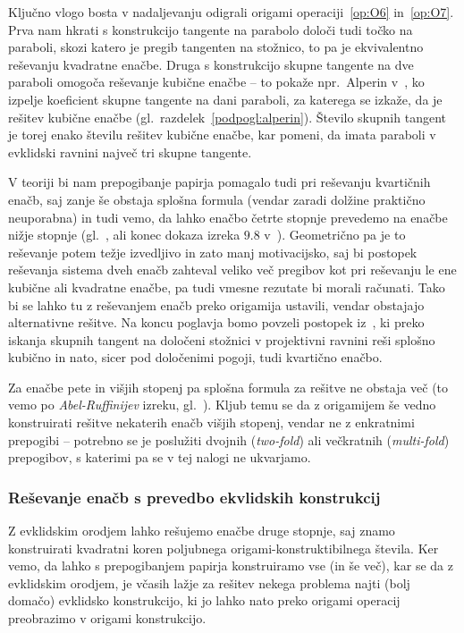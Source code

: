 Ključno vlogo bosta v nadaljevanju odigrali origami operaciji~\ref{op:O6} in~\ref{op:O7}. Prva nam hkrati s konstrukcijo tangente na parabolo določi tudi točko na paraboli, skozi katero je pregib tangenten na stožnico, to pa je ekvivalentno reševanju kvadratne enačbe. Druga s konstrukcijo skupne tangente na dve paraboli omogoča reševanje kubične enačbe -- to pokaže npr.\ Alperin v~\cite[str.\ 129]{alperin2000}, ko izpelje koeficient skupne tangente na dani paraboli, za katerega se izkaže, da je rešitev kubične enačbe (gl.\ razdelek~\ref{podpogl:alperin}). Število skupnih tangent je torej enako številu rešitev kubične enačbe, kar pomeni, da imata paraboli v evklidski ravnini največ tri skupne tangente.

V teoriji bi nam prepogibanje papirja pomagalo tudi pri reševanju kvartičnih enačb, saj zanje še obstaja splošna formula (vendar zaradi dolžine praktično neuporabna) in tudi vemo, da lahko enačbo četrte stopnje prevedemo na enačbe nižje stopnje (gl.\ \cite{quartics2012}, \cite{wikiquartic} ali konec dokaza izreka $9.8$ v~\cite[str.\ 134]{geometricconstructions}). Geometrično pa je to reševanje potem težje izvedljivo in zato manj motivacijsko, saj bi postopek reševanja sistema dveh enačb zahteval veliko več pregibov kot pri reševanju le ene kubične ali kvadratne enačbe, pa tudi vmesne rezutate bi morali računati. Tako bi se lahko tu z reševanjem enačb preko origamija ustavili, vendar obstajajo alternativne rešitve. Na koncu poglavja bomo povzeli postopek iz~\cite{edwards2001}, ki preko iskanja skupnih tangent na določeni stožnici v projektivni ravnini reši splošno kubično in nato, sicer pod določenimi pogoji, tudi kvartično enačbo.

Za enačbe pete in višjih stopenj pa splošna formula za rešitve ne obstaja več (to vemo po \emph{Abel-Ruffinijev} izreku, gl.\ \cite{mrinal2019}). Kljub temu se da z origamijem še vedno konstruirati rešitve nekaterih enačb višjih stopenj, vendar ne z enkratnimi prepogibi -- potrebno se je poslužiti dvojnih (\emph{two-fold}) ali večkratnih (\emph{multi-fold}) prepogibov, s katerimi pa se v tej nalogi ne ukvarjamo. %

\subsubsection*{Reševanje enačb s prevedbo ekvlidskih konstrukcij}

Z evklidskim orodjem lahko rešujemo enačbe druge stopnje, saj znamo konstruirati kvadratni koren poljubnega origami-konstruktibilnega števila. Ker vemo, da lahko s prepogibanjem papirja konstruiramo vse (in še več), kar se da z evklidskim orodjem, je včasih lažje za rešitev nekega problema najti (bolj domačo) evklidsko konstrukcijo, ki jo lahko nato preko origami operacij preobrazimo v origami konstrukcijo.

